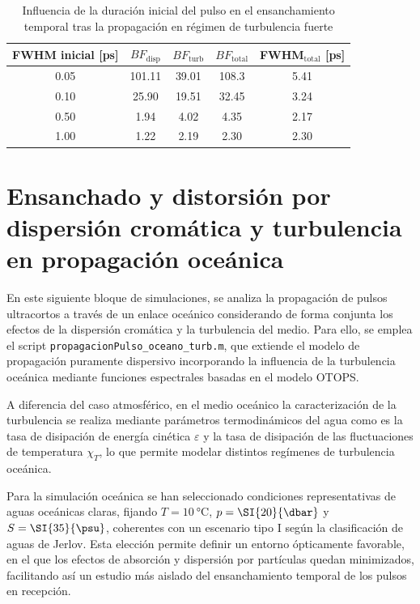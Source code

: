 \begin{table}[H]
\centering
\hspace*{-0.6cm}
\renewcommand{\arraystretch}{1.2}
\begin{tabular}{|c|c|c|c|c|}
\hline
\textbf{FWHM inicial [ps]} & \textbf{$BF_{\mathrm{disp}}$} & \textbf{$BF_{\mathrm{turb}}$} & \textbf{$BF_{\mathrm{total}}$} & \textbf{FWHM$_{\mathrm{total}}$ [ps]} \\
\hline
0.05 & 101.11 & 39.01 & 108.3 & 5.41 \\
0.10 & 25.90 & 19.51 & 32.45 & 3.24 \\
0.50 & 1.94 & 4.02 & 4.35 & 2.17 \\
1.00 & 1.22 & 2.19 & 2.30 & 2.30 \\
\hline
\end{tabular}
\caption{Influencia de la duración inicial del pulso en el ensanchamiento temporal tras la propagación en régimen de turbulencia fuerte}
\label{tabla_atm_duracion_fuerte}
\end{table}


\section{Ensanchado y distorsión por dispersión cromática y turbulencia en propagación oceánica}

En este siguiente bloque de simulaciones, se analiza la propagación de pulsos ultracortos a través de un enlace oceánico considerando de forma conjunta los efectos de la dispersión cromática y la turbulencia del medio. Para ello, se emplea el script \texttt{propagacionPulso\_oceano\_turb.m}, que extiende el modelo de propagación puramente dispersivo incorporando la influencia de la turbulencia oceánica mediante funciones espectrales basadas en el modelo OTOPS.

A diferencia del caso atmosférico, en el medio oceánico la caracterización de la turbulencia se realiza mediante parámetros termodinámicos del agua como es la tasa de disipación de energía cinética $\varepsilon$ y la tasa de disipación de las fluctuaciones de temperatura $\chi_T$, lo que permite modelar distintos regímenes de turbulencia oceánica.

Para la simulación oceánica se han seleccionado condiciones representativas de aguas oceánicas claras, fijando $T=\SI{10}{\celsius}$, $p=\SI{20}{\dbar}$ y $S=\SI{35}{\psu}$, coherentes con un escenario tipo I según la clasificación de aguas de Jerlov. Esta elección permite definir un entorno ópticamente favorable, en el que los efectos de absorción y dispersión por partículas quedan minimizados, facilitando así un estudio más aislado del ensanchamiento temporal de los pulsos en recepción.


